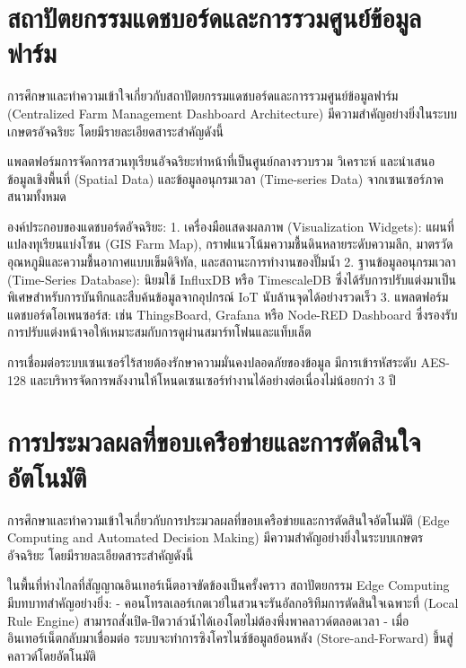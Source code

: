 
\section{สถาปัตยกรรมแดชบอร์ดและการรวมศูนย์ข้อมูลฟาร์ม}

การศึกษาและทำความเข้าใจเกี่ยวกับสถาปัตยกรรมแดชบอร์ดและการรวมศูนย์ข้อมูลฟาร์ม (Centralized Farm Management Dashboard Architecture) มีความสำคัญอย่างยิ่งในระบบเกษตรอัจฉริยะ โดยมีรายละเอียดสาระสำคัญดังนี้

แพลตฟอร์มการจัดการสวนทุเรียนอัจฉริยะทำหน้าที่เป็นศูนย์กลางรวบรวม วิเคราะห์ และนำเสนอข้อมูลเชิงพื้นที่ (Spatial Data) และข้อมูลอนุกรมเวลา (Time-series Data) จากเซนเซอร์ภาคสนามทั้งหมด

องค์ประกอบของแดชบอร์ดอัจฉริยะ:
1. เครื่องมือแสดงผลภาพ (Visualization Widgets): แผนที่แปลงทุเรียนแบ่งโซน (GIS Farm Map), กราฟแนวโน้มความชื้นดินหลายระดับความลึก, มาตรวัดอุณหภูมิและความชื้นอากาศแบบเข็มดิจิทัล, และสถานะการทำงานของปั๊มน้ำ
2. ฐานข้อมูลอนุกรมเวลา (Time-Series Database): นิยมใช้ InfluxDB หรือ TimescaleDB ซึ่งได้รับการปรับแต่งมาเป็นพิเศษสำหรับการบันทึกและสืบค้นข้อมูลจากอุปกรณ์ IoT นับล้านจุดได้อย่างรวดเร็ว
3. แพลตฟอร์มแดชบอร์ดโอเพนซอร์ส: เช่น ThingsBoard, Grafana หรือ Node-RED Dashboard ซึ่งรองรับการปรับแต่งหน้าจอให้เหมาะสมกับการดูผ่านสมาร์ทโฟนและแท็บเล็ต

\begin{techbox}
การเชื่อมต่อระบบเซนเซอร์ไร้สายต้องรักษาความมั่นคงปลอดภัยของข้อมูล มีการเข้ารหัสระดับ AES-128 และบริหารจัดการพลังงานให้โหนดเซนเซอร์ทำงานได้อย่างต่อเนื่องไม่น้อยกว่า 3 ปี
\end{techbox}

\section{การประมวลผลที่ขอบเครือข่ายและการตัดสินใจอัตโนมัติ}

การศึกษาและทำความเข้าใจเกี่ยวกับการประมวลผลที่ขอบเครือข่ายและการตัดสินใจอัตโนมัติ (Edge Computing and Automated Decision Making) มีความสำคัญอย่างยิ่งในระบบเกษตรอัจฉริยะ โดยมีรายละเอียดสาระสำคัญดังนี้

ในพื้นที่ห่างไกลที่สัญญาณอินเทอร์เน็ตอาจขัดข้องเป็นครั้งคราว สถาปัตยกรรม Edge Computing มีบทบาทสำคัญอย่างยิ่ง:
- คอนโทรลเลอร์เกตเวย์ในสวนจะรันอัลกอริทึมการตัดสินใจเฉพาะที่ (Local Rule Engine) สามารถสั่งเปิด-ปิดวาล์วน้ำได้เองโดยไม่ต้องพึ่งพาคลาวด์ตลอดเวลา
- เมื่ออินเทอร์เน็ตกลับมาเชื่อมต่อ ระบบจะทำการซิงโครไนซ์ข้อมูลย้อนหลัง (Store-and-Forward) ขึ้นสู่คลาวด์โดยอัตโนมัติ

